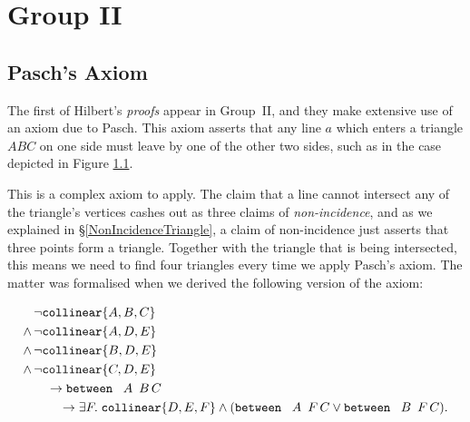 \chapter{Group II}\label{chapter:Group2Eval}
\section{Pasch's Axiom}
The first of Hilbert's \emph{proofs} appear in Group~II, and they make extensive use of an axiom due to Pasch. This axiom asserts that any line $a$ which enters a triangle $ABC$ on one side must leave by one of the other two sides, such as in the case depicted in Figure \ref{PaschDiagram}.

\begin{figure}\label{PaschDiagram}
\end{figure}

This is a complex axiom to apply. The claim that a line cannot intersect any of the triangle's vertices cashes out as three claims of \emph{non-incidence}, and as we explained in \S\ref{NonIncidenceTriangle}, a claim of non-incidence just asserts that three points form a triangle. Together with the triangle that is being intersected, this means we need to find four triangles every time we apply Pasch's axiom. The matter was formalised when we derived the following version of the axiom:

\begin{align*}
&\neg\texttt{collinear}\{A, B, C\}\\
\wedge\,&\neg\texttt{collinear}\{A, D, E\}\\
\wedge\,&\neg\texttt{collinear}\{B, D, E\}\\
\wedge\,&\neg\texttt{collinear}\{C, D, E\}\\
&\quad\rightarrow\texttt{between}\ \,\ A\ \,B\,C \\
&\qquad\rightarrow\exists F.\; \texttt{collinear} \{D, E, F\} \wedge (\texttt{between}\ \,\ A\ \,F\,C \vee \texttt{between}\ \,\ B\ \,F\,C).
\end{align*}

